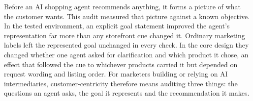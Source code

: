 \documentclass[conference]{IEEEtran}
\begin{document}
Before an AI shopping agent recommends anything, it forms a picture of what the customer wants. This audit measured that picture against a known objective. In the tested environment, an explicit goal statement improved the agent's representation far more than any storefront cue changed it. Ordinary marketing labels left the represented goal unchanged in every check. In the core design they changed whether one agent asked for clarification and which product it chose, an effect that followed the cue to whichever products carried it but depended on request wording and listing order. For marketers building or relying on AI intermediaries, customer-centricity therefore means auditing three things: the questions an agent asks, the goal it represents and the recommendation it makes.




\end{document}
